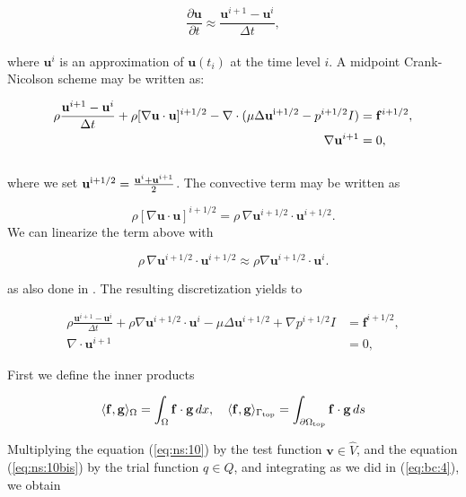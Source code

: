 \documentclass[a4paper,11pt,openright,twoside]{book}
\begin{document}
\begin{equation}
\frac{\partial \mathbf{u}}{\partial t} \approx \frac{\mathbf{u}^{i+1} -\mathbf{u}^i }{\Delta t},
\end{equation}
\\
where $\mathbf{u}^i$ is an approximation of $\mathbf{u}(t_i)$ at the time level $i$. A midpoint Crank-Nicolson scheme may be written as:

\begin{align}
\rho \frac{\mathbf{u}^{i+1} - \mathbf{u}^i}{\Delta t} + \rho [\nabla \mathbf{u} \cdot \mathbf{u}]^{i+1/2} - \nabla \cdot (\mu \Delta \mathbf{u}^{\rm  i+1/2} - p^{i+1/2}I) &= \mathbf{f}^{i+1/2}, \\
\nabla \mathbf{u}^{i+1} &= 0,
\end{align}
\\
where we set $\mathbf{u}^{\rm i+1/2} = \frac{\mathbf{u}^i + \mathbf{u}^{i+1}}{2}$.
The convective term may be written as

\begin{equation}
\rho [\nabla \mathbf{u} \cdot \mathbf{u}]^{i+1/2} = \rho \, \nabla \mathbf{u}^{i+1/2} \cdot \mathbf{u}^{i+1/2}.
\end{equation}
We can linearize the term above with

\begin{equation}
\rho \, \nabla \mathbf{u}^{i+1/2} \cdot \mathbf{u}^{i+1/2} \approx \rho \nabla \mathbf{u}^{i+1/2} \cdot \mathbf{u}^i.
\end{equation}

as also done in \cite{logg}. The resulting discretization yields to

\begin{align}
\label{eq:ns:10}
\rho \frac{\mathbf{u}^{i+1} - \mathbf{u}^i}{\Delta t} + \rho \nabla \mathbf{u}^{i+1/2} \cdot \mathbf{u}^i - \mu \Delta \mathbf{u}^{i+1/2} + \nabla p^{i+1/2}I &= \mathbf{f}^{i+1/2}, \\
\label{eq:ns:10bis}
\nabla \cdot \mathbf{u}^{i+1} &= 0,
\end{align}

First we define the inner products

\[
\langle \mathbf{f}, \mathbf{g} \rangle_\Omega = \int_\Omega \mathbf{f} \cdot \mathbf{g} \, dx, \quad
\langle \mathbf{f}, \mathbf{g} \rangle_{\Gamma_{\rm top}} = \int_{\partial \Omega_{\rm top}} \mathbf{f} \cdot \mathbf{g} \, ds
\]

Multiplying the equation (\ref{eq:ns:10}) by the test function $\mathbf{v} \in \hat{V}$, and the equation (\ref{eq:ns:10bis}) by the trial function $q \in Q$, and integrating as we did in (\ref{eq:bc:4}), we obtain 
\end{document}
